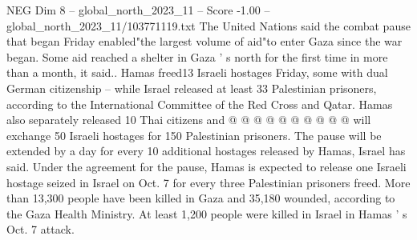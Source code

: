 \begin{textsample}{NEG Dim 8 – global\_north\_2023\_11 – Score -1.00 – global\_north\_2023\_11/103771119.txt}
The United Nations said the combat pause that began Friday enabled"the largest volume of aid"to enter Gaza since the war began.
Some aid reached a shelter in Gaza ' s north for the first time in more than a month, it said..
Hamas freed13 Israeli hostages Friday, some with dual German citizenship -- while Israel released at least 33 Palestinian prisoners, according to the International Committee of the Red Cross and Qatar.
Hamas also separately released 10 Thai citizens and @ @ @ @ @ @ @ @ @ @ will exchange 50 Israeli hostages for 150 Palestinian prisoners.
The pause will be extended by a day for every 10 additional hostages released by Hamas, Israel has said.
Under the agreement for the pause, Hamas is expected to release one Israeli hostage seized in Israel on Oct. 7 for every three Palestinian prisoners freed.
More than 13,300 people have been killed in Gaza and 35,180 wounded, according to the Gaza Health Ministry.
At least 1,200 people were killed in Israel in Hamas ' s Oct. 7 attack.

\end{textsample}

